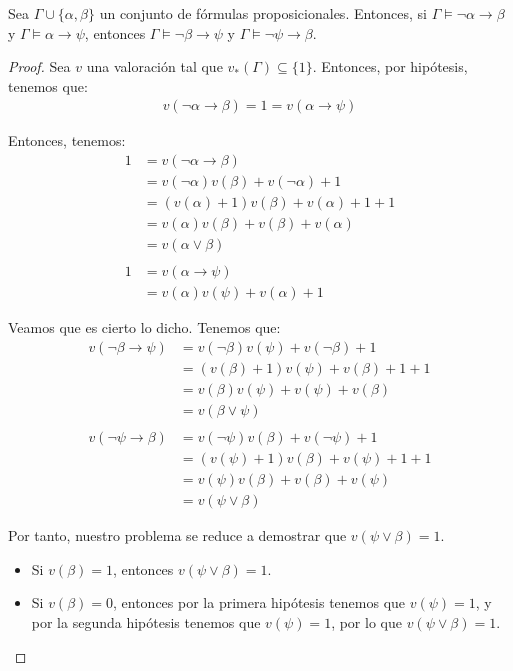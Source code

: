 \begin{ejercicio}
    Sea $\Gamma \cup \{\alpha,\beta\}$ un conjunto de fórmulas proposicionales.
    Entonces, si $\Gamma \models \lnot \alpha \rightarrow \beta$ y $\Gamma \models \alpha\rightarrow \psi$,
    entonces $\Gamma \models \lnot \beta \rightarrow \psi$ y $\Gamma \models \lnot \psi \rightarrow \beta$.
    \begin{proof}
        Sea $v$ una valoración tal que $v_\ast(\Gamma)\subseteq \{1\}$.
        Entonces, por hipótesis, tenemos que:
        \begin{align*}
            v(\lnot \alpha\rightarrow \beta)  = 1 = v(\alpha\rightarrow \psi)
        \end{align*}

        Entonces, tenemos:
        \begin{align*}
            1 &= v(\lnot \alpha \rightarrow \beta)\\
            &=v(\lnot \alpha)v(\beta)+v(\lnot \alpha)+1\\
            &= (v(\alpha)+1)v(\beta)+v(\alpha)+1+1\\
            &= v(\alpha)v(\beta)+v(\beta)+v(\alpha)\\
            &= v(\alpha\lor \beta)\\\\
            1 &= v(\alpha\rightarrow \psi)\\
            &= v(\alpha)v(\psi)+v(\alpha)+1
        \end{align*}

        Veamos que es cierto lo dicho. Tenemos que:
        \begin{align*}
            v(\lnot \beta\rightarrow \psi)
            &= v(\lnot \beta)v(\psi)+v(\lnot \beta)+1\\
            &= (v(\beta)+1)v(\psi)+v(\beta)+1+1\\
            &= v(\beta)v(\psi)+v(\psi)+v(\beta)\\
            &= v(\beta\lor \psi)\\ \\
            v(\lnot \psi\rightarrow \beta)
            &= v(\lnot \psi)v(\beta)+v(\lnot \psi)+1\\
            &= (v(\psi)+1)v(\beta)+v(\psi)+1+1\\
            &= v(\psi)v(\beta)+v(\beta)+v(\psi)\\
            &= v(\psi\lor \beta)
        \end{align*}

        Por tanto, nuestro problema se reduce a demostrar que $v(\psi\lor \beta)=1$.
        \begin{itemize}
            \item Si $v(\beta)=1$, entonces $v(\psi\lor \beta)=1$.
            \item Si $v(\beta)=0$, entonces por la primera hipótesis tenemos que $v(\psi)=1$, y por la
            segunda hipótesis tenemos que $v(\psi)=1$, por lo que $v(\psi\lor \beta)=1$. 
        \end{itemize}


\end{proof}
\end{ejercicio}
